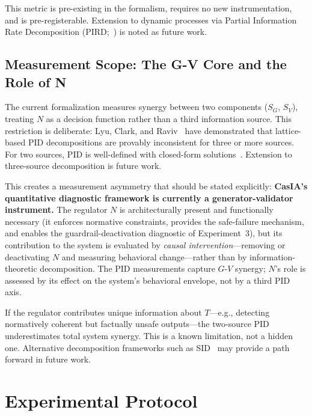 \documentclass[11pt,a4paper]{article}
\theoremstyle{definition}
\begin{document}
This metric is pre-existing in the formalism, requires no new instrumentation, and is pre-registerable. Extension to dynamic processes via Partial Information Rate Decomposition (PIRD;~\cite{faes2025pird}) is noted as future work.

\subsection{Measurement Scope: The G-V Core and the Role of N}
\label{subsec:threesource}

The current formalization measures synergy between two components ($S_G$, $S_V$), treating $N$ as a decision function rather than a third information source. This restriction is deliberate: Lyu, Clark, and Raviv~\cite{lyu2025multivariate} have demonstrated that lattice-based PID decompositions are provably inconsistent for three or more sources. For two sources, PID is well-defined with closed-form solutions~\cite{williams2010pid,bertschinger2014pid}. Extension to three-source decomposition is future work.

This creates a measurement asymmetry that should be stated explicitly: \textbf{CasIA's quantitative diagnostic framework is currently a generator-validator instrument.} The regulator $N$ is architecturally present and functionally necessary (it enforces normative constraints, provides the safe-failure mechanism, and enables the guardrail-deactivation diagnostic of Experiment~3), but its contribution to the system is evaluated by \emph{causal intervention}---removing or deactivating $N$ and measuring behavioral change---rather than by information-theoretic decomposition. The PID measurements capture $G$-$V$ synergy; $N$'s role is assessed by its effect on the system's behavioral envelope, not by a third PID axis.

If the regulator contributes unique information about $T$---e.g., detecting normatively coherent but factually unsafe outputs---the two-source PID underestimates total system synergy. This is a known limitation, not a hidden one. Alternative decomposition frameworks such as SID~\cite{lyu2025multivariate} may provide a path forward in future work.


\section{Experimental Protocol}
\label{sec:experiments}
\end{document}
